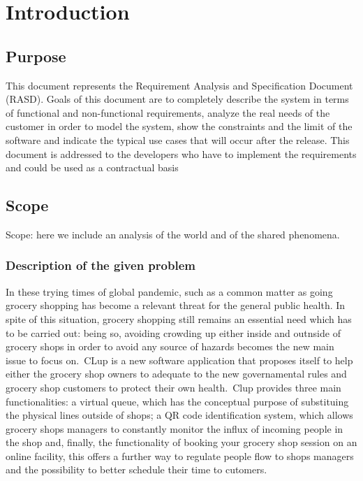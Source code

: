 \section{Introduction}
\label{sect:introduction}

\subsection{Purpose}
\label{subsect:purpose}

This document represents the Requirement Analysis and Specification Document (RASD). Goals of this document are to completely describe the system in terms of functional and non-functional requirements, analyze the real needs of the customer in order to model the system, show the constraints and the limit of the software and indicate the typical use cases that will occur after the release. This document is addressed to the developers who have to implement the requirements and could be used as a contractual basis

\subsection{Scope}
\label{subsect:scope}

Scope: here we include an analysis of the world and of the shared phenomena.

\subsubsection{Description of the given problem}
\label{subsect:descriptionofthegivenproblem}

In these trying times of global pandemic, such as a common matter as going grocery shopping has become a relevant threat for the general public health. In spite of this situation, grocery shopping still remains an essential need which has to be carried out: being so, avoiding crowding up either inside and outnside of grocery shops in order to avoid any source of hazards becomes the new main issue to focus on.\ CLup is a new software application that proposes itself to help either the grocery shop owners to adequate to the new governamental rules and grocery shop customers to protect their own health.\ Clup provides three main functionalities: a virtual queue, which has the conceptual purpose of substituing the physical lines outside of shops; a QR code identification system, which allows grocery shops managers to constantly monitor the influx of incoming people in the shop and, finally, the functionality of booking your grocery shop session on an online facility, this offers a further way to regulate people flow to shops managers and the possibility to better schedule their time to cutomers.


